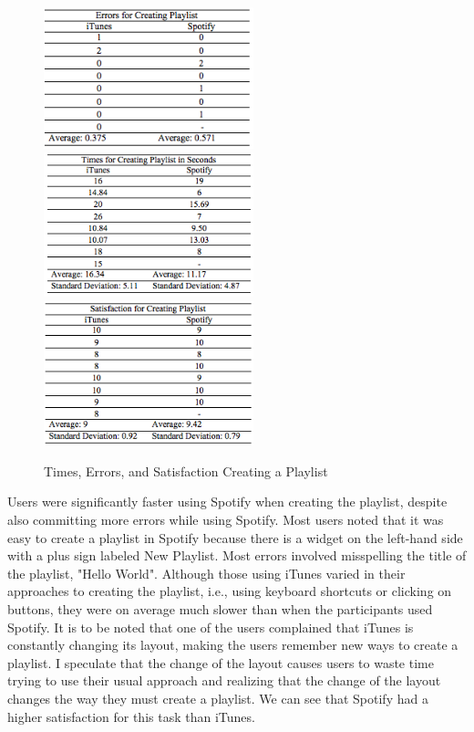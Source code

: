 \documentclass[11pt]{article}
\begin{document}
\begin{figure}[H] %
   \centering
   \includegraphics[width=2.4in]{errors_playlist.png}       
   \includegraphics[width=2.4in]{times_playlist.png} 
   \includegraphics[width=2.4in]{satisfaction_playlist.png} 
   \caption{Times, Errors, and Satisfaction Creating a Playlist}
   \label{fig:playlist}
\end{figure}

Users were significantly faster using Spotify when creating the playlist, despite also committing more errors while using Spotify. Most users noted  that it was easy to create a playlist in Spotify because there is a widget on the left-hand side with a plus sign labeled New Playlist. Most errors involved misspelling the title of the playlist, "Hello World". Although those using iTunes varied in their approaches to creating the playlist, i.e., using keyboard shortcuts or clicking on buttons, they were on average much slower than when the participants used Spotify. It is to be noted that one of the users complained that iTunes is constantly changing its layout, making the users remember new ways to create a playlist. I speculate that the change of the layout causes users to waste time trying to use their usual approach and realizing that the change of the layout changes the way they must create a playlist. We can see that Spotify had a higher satisfaction for this task than iTunes. 
\end{document}
